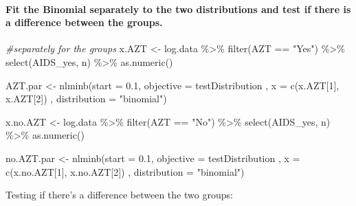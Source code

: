 \documentclass[
]{article}
\newenvironment{Shaded}{\begin{snugshade}}{\end{snugshade}}
\newcommand{\AttributeTok}[1]{\textcolor[rgb]{0.77,0.63,0.00}{#1}}
\newcommand{\CommentTok}[1]{\textcolor[rgb]{0.56,0.35,0.01}{\textit{#1}}}
\newcommand{\DecValTok}[1]{\textcolor[rgb]{0.00,0.00,0.81}{#1}}
\newcommand{\FloatTok}[1]{\textcolor[rgb]{0.00,0.00,0.81}{#1}}
\newcommand{\FunctionTok}[1]{\textcolor[rgb]{0.00,0.00,0.00}{#1}}
\newcommand{\NormalTok}[1]{#1}
\newcommand{\OtherTok}[1]{\textcolor[rgb]{0.56,0.35,0.01}{#1}}
\newcommand{\SpecialCharTok}[1]{\textcolor[rgb]{0.00,0.00,0.00}{#1}}
\newcommand{\StringTok}[1]{\textcolor[rgb]{0.31,0.60,0.02}{#1}}
\begin{document}
\hypertarget{fit-the-binomial-separately-to-the-two-distributions-and-test-if-there-is-a-difference-between-the-groups.}{%
\paragraph{Fit the Binomial separately to the two distributions and test
if there is a difference between the
groups.}\label{fit-the-binomial-separately-to-the-two-distributions-and-test-if-there-is-a-difference-between-the-groups.}}

\begin{Shaded}
\begin{Highlighting}[]
\CommentTok{\#separately for the groups}
\NormalTok{x.AZT }\OtherTok{\textless{}{-}}\NormalTok{ log.data }\SpecialCharTok{\%\textgreater{}\%}
  \FunctionTok{filter}\NormalTok{(AZT }\SpecialCharTok{==} \StringTok{"Yes"}\NormalTok{) }\SpecialCharTok{\%\textgreater{}\%}
  \FunctionTok{select}\NormalTok{(AIDS\_yes, n) }\SpecialCharTok{\%\textgreater{}\%}
  \FunctionTok{as.numeric}\NormalTok{()}

\NormalTok{AZT.par }\OtherTok{\textless{}{-}} \FunctionTok{nlminb}\NormalTok{(}\AttributeTok{start =} \FloatTok{0.1}\NormalTok{, }\AttributeTok{objective =}\NormalTok{ testDistribution}
\NormalTok{                  , }\AttributeTok{x =} \FunctionTok{c}\NormalTok{(x.AZT[}\DecValTok{1}\NormalTok{], x.AZT[}\DecValTok{2}\NormalTok{])}
\NormalTok{                  , }\AttributeTok{distribution =} \StringTok{"binomial"}\NormalTok{)}

\NormalTok{x.no.AZT }\OtherTok{\textless{}{-}}\NormalTok{ log.data }\SpecialCharTok{\%\textgreater{}\%}
  \FunctionTok{filter}\NormalTok{(AZT }\SpecialCharTok{==} \StringTok{"No"}\NormalTok{) }\SpecialCharTok{\%\textgreater{}\%}
  \FunctionTok{select}\NormalTok{(AIDS\_yes, n) }\SpecialCharTok{\%\textgreater{}\%}
  \FunctionTok{as.numeric}\NormalTok{()}

\NormalTok{no.AZT.par }\OtherTok{\textless{}{-}} \FunctionTok{nlminb}\NormalTok{(}\AttributeTok{start =} \FloatTok{0.1}\NormalTok{, }\AttributeTok{objective =}\NormalTok{ testDistribution}
\NormalTok{                     , }\AttributeTok{x =} \FunctionTok{c}\NormalTok{(x.no.AZT[}\DecValTok{1}\NormalTok{], x.no.AZT[}\DecValTok{2}\NormalTok{])}
\NormalTok{                     , }\AttributeTok{distribution =} \StringTok{"binomial"}\NormalTok{)}
\end{Highlighting}
\end{Shaded}

Testing if there's a difference between the two groups:
\end{document}
